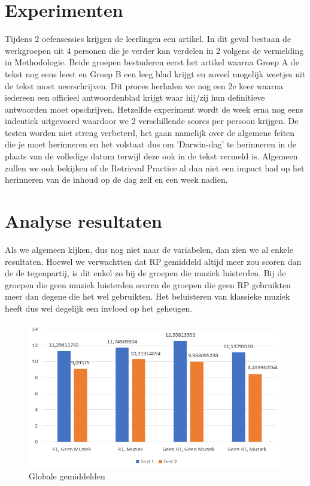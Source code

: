 \documentclass{hogent-article}
\begin{document}
	\section{Experimenten}
	Tijdens 2 oefensessies krijgen de leerlingen een artikel. In dit geval bestaan de werkgroepen uit 4 personen die je verder kan verdelen in 2 volgens de vermelding in Methodologie. Beide groepen bestuderen eerst het 
	artikel waarna Groep A de tekst nog eens leest en Groep B een leeg blad krijgt en zoveel mogelijk weetjes uit de tekst moet neerschrijven. Dit proces herhalen we nog een 2e keer waarna iedereen een officieel antwoordenblad krijgt waar hij/zij hun definitieve antwoorden moet opschrijven. Hetzelfde experiment wordt de week erna nog eens indentiek uitgevoerd waardoor we 2 verschillende scores per persoon krijgen.
	De testen worden niet streng verbeterd, het gaan namelijk over de algemene feiten die je moet herinneren en het volstaat dus om 'Darwin-dag' te herinneren in de plaats van de volledige datum terwijl deze ook in de tekst vermeld is. Algemeen zullen we ook bekijken of de Retrieval Practice al dan niet een impact had op het herinneren van de inhoud op de dag zelf en een week nadien.
	
	
	\section{Analyse resultaten}
	 Als we algemeen kijken, dus nog niet naar de variabelen, dan zien we al enkele resultaten. Hoewel we verwachtten dat RP gemiddeld altijd meer zou scoren dan de de tegenpartij, is dit enkel zo bij de groepen die muziek luisterden. Bij de groepen die geen muziek luisterden scoren de groepen die geen RP gebruikten meer dan degene die het wel gebruikten. Het beluisteren van klassieke muziek heeft dus wel degelijk een invloed op het geheugen.
	
	\begin{figure}[H]
		\includegraphics[width=\linewidth]{img/algemeen.png}
		\caption{Globale gemiddelden}
	\end{figure}
	
\end{document}

